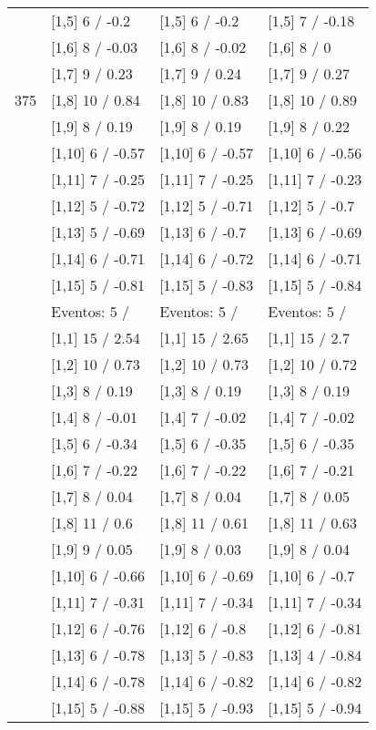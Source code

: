 \begin{table}
\begin{tabular}[t]{llll}
 & {}[1,5] 6  / -0.2 & {}[1,5] 6  / -0.2 & {}[1,5] 7  / -0.18\\
 & {}[1,6] 8  / -0.03 & {}[1,6] 8  / -0.02 & {}[1,6] 8  / 0\\
 & {}[1,7] 9  / 0.23 & {}[1,7] 9  / 0.24 & {}[1,7] 9  / 0.27\\
375 & {}[1,8] 10  / 0.84 & {}[1,8] 10  / 0.83 & {}[1,8] 10  / 0.89\\
\addlinespace
 & {}[1,9] 8  / 0.19 & {}[1,9] 8  / 0.19 & {}[1,9] 8  / 0.22\\
 & {}[1,10] 6  / -0.57 & {}[1,10] 6  / -0.57 & {}[1,10] 6  / -0.56\\
 & {}[1,11] 7  / -0.25 & {}[1,11] 7  / -0.25 & {}[1,11] 7  / -0.23\\
 & {}[1,12] 5  / -0.72 & {}[1,12] 5  / -0.71 & {}[1,12] 5  / -0.7\\
 & {}[1,13] 5  / -0.69 & {}[1,13] 6  / -0.7 & {}[1,13] 6  / -0.69\\
\addlinespace
 & {}[1,14] 6  / -0.71 & {}[1,14] 6  / -0.72 & {}[1,14] 6  / -0.71\\
 & {}[1,15] 5  / -0.81 & {}[1,15] 5  / -0.83 & {}[1,15] 5  / -0.84\\
 & Eventos:  5 / & Eventos:  5 / & Eventos:  5 /\\
 & {}[1,1] 15  / 2.54 & {}[1,1] 15  / 2.65 & {}[1,1] 15  / 2.7\\
 & {}[1,2] 10  / 0.73 & {}[1,2] 10  / 0.73 & {}[1,2] 10  / 0.72\\
\addlinespace
 & {}[1,3] 8  / 0.19 & {}[1,3] 8  / 0.19 & {}[1,3] 8  / 0.19\\
 & {}[1,4] 8  / -0.01 & {}[1,4] 7  / -0.02 & {}[1,4] 7  / -0.02\\
 & {}[1,5] 6  / -0.34 & {}[1,5] 6  / -0.35 & {}[1,5] 6  / -0.35\\
 & {}[1,6] 7  / -0.22 & {}[1,6] 7  / -0.22 & {}[1,6] 7  / -0.21\\
 & {}[1,7] 8  / 0.04 & {}[1,7] 8  / 0.04 & {}[1,7] 8  / 0.05\\
\addlinespace
500 & {}[1,8] 11  / 0.6 & {}[1,8] 11  / 0.61 & {}[1,8] 11  / 0.63\\
 & {}[1,9] 9  / 0.05 & {}[1,9] 8  / 0.03 & {}[1,9] 8  / 0.04\\
 & {}[1,10] 6  / -0.66 & {}[1,10] 6  / -0.69 & {}[1,10] 6  / -0.7\\
 & {}[1,11] 7  / -0.31 & {}[1,11] 7  / -0.34 & {}[1,11] 7  / -0.34\\
 & {}[1,12] 6  / -0.76 & {}[1,12] 6  / -0.8 & {}[1,12] 6  / -0.81\\
\addlinespace
 & {}[1,13] 6  / -0.78 & {}[1,13] 5  / -0.83 & {}[1,13] 4  / -0.84\\
 & {}[1,14] 6  / -0.78 & {}[1,14] 6  / -0.82 & {}[1,14] 6  / -0.82\\
 & {}[1,15] 5  / -0.88 & {}[1,15] 5  / -0.93 & {}[1,15] 5  / -0.94\\
\bottomrule
\end{tabular}
\end{table}
